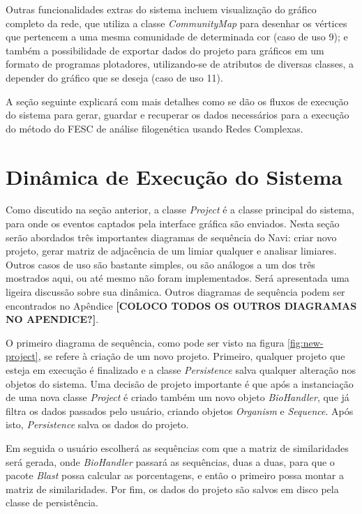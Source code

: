 Outras funcionalidades extras do sistema incluem visualização do gráfico completo da rede, que utiliza a classe \textit{CommunityMap} para desenhar
os vértices que pertencem a uma mesma comunidade de determinada cor (caso de uso 9); e também a possibilidade de exportar dados do projeto para
gráficos em um formato de programas plotadores, utilizando-se de atributos de diversas classes, a depender do gráfico que se deseja (caso de uso 11).

A seção seguinte explicará com mais detalhes como se dão os fluxos de execução do sistema para gerar, guardar e recuperar os dados necessários para a
execução do método do FESC de análise filogenética usando Redes Complexas.

\section{Dinâmica de Execução do Sistema} \label{sec:dinamica}

Como discutido na seção anterior, a classe \textit{Project} é a classe principal do sistema, para onde os eventos captados pela interface gráfica são
enviados. Nesta seção serão abordados três importantes diagramas de sequência do Navi: criar novo projeto, gerar matriz de adjacência de um limiar qualquer
e analisar limiares. Outros casos de uso são bastante simples, ou são análogos a um dos três mostrados aqui, ou até mesmo não foram implementados. Será
apresentada uma ligeira discussão sobre sua dinâmica. Outros diagramas de sequência podem ser encontrados no Apêndice \textbf{[COLOCO TODOS OS OUTROS
DIAGRAMAS NO APENDICE?]}.

O primeiro diagrama de sequência, como pode ser visto na figura \ref{fig:new-project}, se refere à criação de um novo projeto. Primeiro, qualquer projeto
que esteja em execução é finalizado e a classe \textit{Persistence} salva qualquer alteração nos objetos do sistema. Uma decisão de projeto importante
é que após a instanciação de uma nova classe \textit{Project} é criado também um novo objeto \textit{BioHandler}, que já filtra os dados passados pelo
usuário, criando objetos \textit{Organism} e \textit{Sequence}. Após isto, \textit{Persistence} salva os dados do projeto.

Em seguida o usuário escolherá as sequências com que a matriz de similaridades será gerada, onde \textit{BioHandler} passará as sequências, duas a duas,
para que o pacote \textit{Blast} possa calcular as porcentagens, e então o primeiro possa montar a matriz de similaridades. Por fim, os dados do projeto
são salvos em disco pela classe de persistência. \newline

